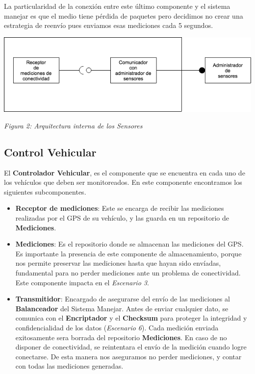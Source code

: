 La particularidad de la conexión entre este último componente y el sistema
manejar es que el medio tiene pérdida de paquetes pero decidimos no crear una 
estrategia de reenvío pues enviamos esas mediciones cada 5 segundos.


\centerline{\includegraphics[width=1\textwidth]{./imagenes/arquitectura_tp2/sensor.png}}
\centerline{\textit{Figura 2: Arquitectura interna de los Sensores}}


\subsection{Control Vehicular}

El \textbf{Controlador Vehicular}, es el componente que se encuentra en cada uno de los vehículos
que deben ser monitoreados. En este componente encontramos los siguientes subcomponentes.

\begin{itemize}
\item \textbf{Receptor de mediciones}: Este se encarga de recibir las mediciones realizadas por el GPS de su vehículo,
 y las guarda en un repositorio de \textbf{Mediciones}.
 
\item \textbf{Mediciones}: Es el repositorio donde se almacenan las mediciones del GPS.
 Es importante la presencia de este componente de almacenamiento, porque nos permite preservar
las mediciones hasta que hayan sido envíadas, fundamental para no perder mediciones ante un
problema de conectividad. Este componente impacta en el \textit{Escenario 3}.

\item \textbf{Transmitidor}: Encargado de asegurarse del envío de las mediciones al \textbf{Balanceador}
del Sistema Manejar. Antes de enviar cualquier dato, se comunica con el \textbf{Encriptador} y el
\textbf{Checksum} para proteger la integridad y confidencialidad de los datos (\textit{Escenario 
6}).
Cada medición enviada exitosamente sera borrada del repositorio \textbf{Mediciones}.
En caso de no disponer de conectividad, se reintentara el envío de la medición cuando logre conectarse.
De esta manera nos aseguramos no perder mediciones, y contar con todas las mediciones generadas.
\end{itemize}


